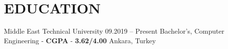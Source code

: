 \section{EDUCATION}

\resumeSubHeadingListStart
  
\resumeSubheading
  {Middle East Technical University}
  {09.2019 -- Present}
  {Bachelor's, Computer Engineering - \textbf{CGPA} - \textbf{3.62/4.00}}
  {Ankara, Turkey}
    \resumeItemListStart
    \resumeItemListEnd
\resumeSubHeadingListEnd
